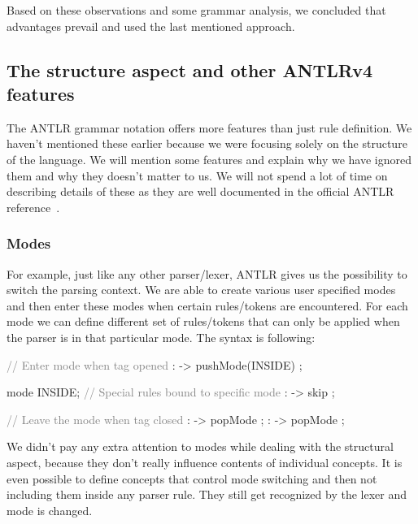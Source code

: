 Based on these observations and some grammar analysis, we concluded that advantages prevail and used the last mentioned approach.

\subsection{The structure aspect and other ANTLRv4 features}

The ANTLR grammar notation offers more features than just rule definition. 
We haven't mentioned these earlier because we were focusing solely on the structure of the language. 
We will mention some features and explain why we have ignored them and why they doesn't matter to us. 
We will not spend a lot of time on describing details of these as they are well documented in the official ANTLR reference~\cite{ANTLR4reference}.

\subsubsection{Modes}

For example, just like any other parser/lexer, ANTLR gives us the possibility to switch the parsing context. 
We are able to create various user specified modes and then enter these modes when certain rules/tokens are encountered. 
For each mode we can define different set of rules/tokens that can only be applied when the parser is in that particular mode. 
The syntax is following:

\begin{antlr}
	\textcolor{gray}{// Enter mode when tag opened}
	        :   \literal{<}       -> pushMode(INSIDE) ;
	
	mode INSIDE;
	\textcolor{gray}{// Special rules bound to specific mode}
	           :    -> skip ;
	
	\textcolor{gray}{// Leave the mode when tag closed}
	       :   \literal{>}       -> popMode ;
	 :   \literal{/>}      -> popMode ;
\end{antlr}

We didn't pay any extra attention to modes while dealing with the structural aspect, because they don't really influence contents of individual concepts.
It is even possible to define concepts that control mode switching and then not including them inside any parser rule.
They still get recognized by the lexer and mode is changed.
\\

